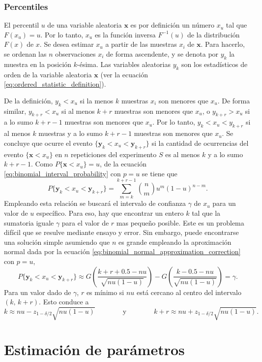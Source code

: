 \documentclass[a4paper]{report}
\newcommand{\x}{\mathbf{x}}
\newcommand{\y}{\mathbf{y}}
\begin{document}
\subsubsection{Percentiles} 

El percentil \(u\) de una variable aleatoria \(\x\) es por definición un número \(x_u\) tal que \(F(x_u)=u\). Por lo tanto, \(x_u\) es la función inversa \(F^{-1}(u)\) de la distribución \(F(x)\) de \(x\). Se desea estimar \(x_u\) a partir de las muestras \(x_i\) de \(\x\). Para hacerlo, se ordenan las \(n\) observaciones \(x_i\) de forma ascendente, y se denota por \(y_k\) la muestra en la posición \(k\)-ésima. Las variables aleatorias \(y_k\) son los estadísticos de orden de la variable aleatoria \(\x\) (ver la ecuación \ref{eq:ordered_statistic_definition}).

De la definición, \(y_k<x_u\) si la menos \(k\) muestras \(x_i\) son menores que \(x_u\). De forma similar, \(y_{k+r}<x_u\) si al menos \(k+r\) muestras son menores que \(x_u\), o \(y_{k+r}>x_u\) si a lo sumo \(k+r-1\) muestras son menores que \(x_u\). Por lo tanto, \(y_k<x_u<y_{k+r}\) si al menos \(k\) muestras y a lo sumo \(k+r-1\) muestras son menores que \(x_u\). Se concluye que ocurre el evento \(\{\y_k<x_u<\y_{k+r}\}\) si la cantidad de ocurrencias del evento \(\{\x<x_u\}\) en \(n\) repeticiones del experimento \(S\) es al menos \(k\) y a lo sumo \(k+r-1\). Como \(P\{\x<x_u\}=u\), de la ecuación \ref{eq:binomial_interval_probability} con \(p=u\) se tiene que 
\[
 P\{\y_k<x_u<\y_{k+r}\}=\sum_{m=k}^{k+r-1}\binom{n}{m}u^m(1-u)^{n-m}.
\]
Empleando esta relación se buscará el intervalo de confianza \(\gamma\) de \(x_u\) para un valor de \(u\) específico. Para eso, hay que encontrar un entero \(k\) tal que la sumatoria iguale \(\gamma\) para el valor de \(r\) mas pequeño posible. Este es un problema difícil que se resulve mediante ensayo y error. Sin embargo, puede encontrarse una solución simple asumiendo que \(n\) es grande empleando la aproximación normal dada por la ecuación \ref{eq:binomial_normal_approximation_correction} con \(p=u\),
\[
 P\{\y_k<x_u<\y_{k+r}\}\approx G\left(\frac{k+r+0.5-nu}{\sqrt{nu(1-u)}}\right)-G\left(\frac{k-0.5-nu}{\sqrt{nu(1-u)}}\right)=\gamma.
\]
Para un valor dado de \(\gamma\), \(r\) es mínimo si \(nu\) está cercano al centro del intervalo \((k,\,k+r)\). Esto conduce a 
\[
 k\approx nu-z_{1-\delta/2}\sqrt{nu(1-u)}
 \qquad\qquad\textrm{y}\qquad\qquad
 k+r\approx nu+z_{1-\delta/2}\sqrt{nu(1-u)}.
\]

\section{Estimación de parámetros}
\end{document}
